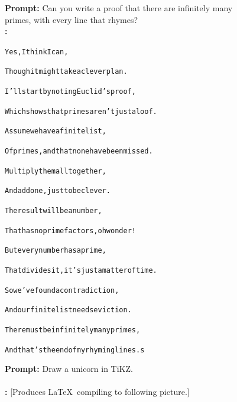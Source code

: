 \begin{figure}
\begin{AIbox}{\DV}
\parbox[t]{0.55\linewidth}{
{\small {\bf Prompt:} Can you write a proof that there are infinitely many primes, with every line that rhymes?}\\

{\small\bf \DV:} \scriptsize \begin{alltt}
Yes, I think I can,

Though it might take a clever plan. 

I'll start by noting Euclid's proof, 

Which shows that primes aren't just aloof. 

Assume we have a finite list, 

Of primes, and that none have been missed. 

Multiply them all together, 

And add one, just to be clever. 

The result will be a number, 

That has no prime factors, oh wonder! 

But every number has a prime, 

That divides it, it's just a matter of time. 

So we've found a contradiction, 

And our finite list needs eviction. 

There must be infinitely many primes, 

And that's the end of my rhyming lines.s
\end{alltt}}
\hspace{0.2in}
\parbox[t]{0.4\linewidth}{\small {\bf Prompt:} Draw a unicorn in TiKZ.\\\ \\

{\bf \DV:}
{\scriptsize [Produces \LaTeX\ compiling to following picture.]} \\

}
\end{AIbox}
\end{figure}
